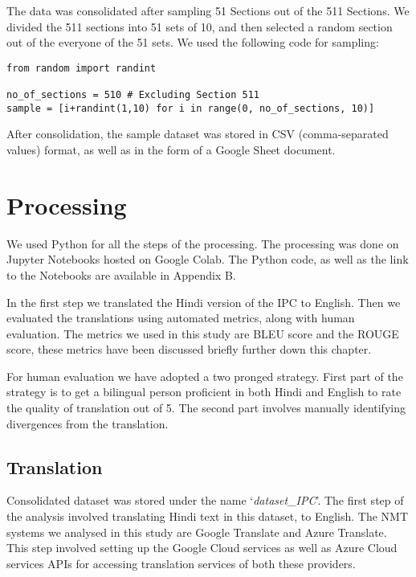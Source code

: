 The data was consolidated after sampling 51 Sections out of the 511 Sections. We divided the 511 sections into 51 sets of 10, and then selected a random section out of the everyone of the 51 sets. We used the following code for sampling:

\singlespacing
\begin{verbatim}
from random import randint

no_of_sections = 510 # Excluding Section 511
sample = [i+randint(1,10) for i in range(0, no_of_sections, 10)]
\end{verbatim}
\doublespacing

After consolidation, the sample dataset was stored in CSV (comma-separated values) format, as well as in the form of a Google Sheet document.

\section{Processing}

We used Python for all the steps of the processing. The processing was done on Jupyter Notebooks hosted on Google Colab. The Python code, as well as the link to the Notebooks are available in Appendix B.

In the first step we translated the Hindi version of the IPC to English. Then we evaluated the translations using automated metrics, along with human evaluation. The metrics we used in this study are BLEU score and the ROUGE score, these metrics have been discussed briefly further down this chapter.

For human evaluation we have adopted a two pronged strategy. First part of the strategy is to get a bilingual person proficient in both Hindi and English to rate the quality of translation out of 5. The second part involves manually identifying divergences from the translation.

\subsection{Translation}

Consolidated dataset was stored under the name `\textit{dataset\_IPC}'. The first step of the analysis involved translating Hindi text in this dataset, to English. The NMT systems we analysed in this study are Google Translate and Azure Translate. This step involved setting up the Google Cloud services as well as Azure Cloud services APIs for accessing translation services of both these providers. 

